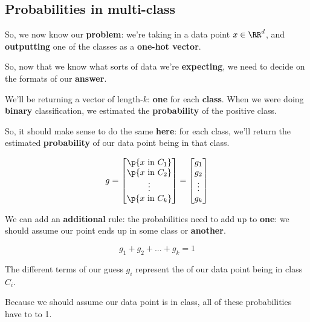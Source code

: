     \subsection{Probabilities in multi-class}
    
        So, we now know our \textbf{problem}: we're taking in a data point $x \in \RR^d$, and \textbf{outputting} one of the classes as a \textbf{one-hot vector}.
        
        So, now that we know what sorts of data we're \textbf{expecting}, we need to decide on the formats of our \textbf{answer}.
        
        We'll be returning a vector of length-$k$: \textbf{one} for each \textbf{class}. When we were doing \textbf{binary} classification, we estimated the \textbf{probability} of the positive class.
        
        So, it should make sense to do the same \textbf{here}: for each class, we'll return the estimated \textbf{probability} of our data point being in that class.
        
        \begin{equation}
            g
            =
            \begin{bmatrix}
              \p{x \text{ in } C_1} \\ 
              \p{x \text{ in } C_2} \\ 
              \vdots \\ 
              \p{x \text{ in } C_k} 
            \end{bmatrix}
            =
            \begin{bmatrix}
              g_1\\g_2\\\vdots\\g_k
            \end{bmatrix}
        \end{equation}
        
        We can add an \textbf{additional} rule: the probabilities need to add up to \textbf{one}: we should assume our point ends up in some class or \textbf{another}.
        
        \begin{equation}
            g_1+g_2+...+g_k=1
        \end{equation}
        
        \begin{concept}
            The different terms of our  guess $g_i$ represent the  of our data point being in class $C_i$.
            
            Because we should assume our data point is in  class, all of these probabilities have to  to 1.
        \end{concept}
        
